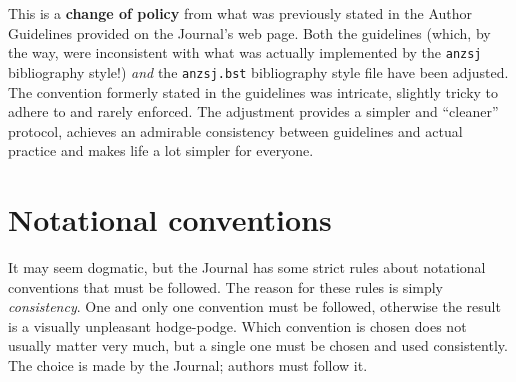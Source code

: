 \documentclass[times, doublespace]{anzsauth}
\begin{document}
This is a \textbf{change of policy} from what was previously stated
in the Author Guidelines provided on the Journal's web page.
Both the guidelines (which, by the way, were inconsistent with
what was actually implemented by the \texttt{anzsj} bibliography
style!) \emph{and} the \texttt{anzsj.bst} bibliography style file
have been adjusted.  The convention formerly stated in the guidelines
was intricate, slightly tricky to adhere to and rarely enforced.
The adjustment provides a simpler and ``cleaner'' protocol, achieves
an admirable consistency between guidelines and actual practice
and makes life a lot simpler for everyone.

\section{Notational conventions}
\label{sec:noteConv}
It may seem dogmatic, but the Journal has some strict rules
about notational conventions that must be followed.  The reason
for these rules is simply \emph{consistency}.  One and only one
convention must be followed, otherwise the result is a visually
unpleasant hodge-podge.  Which convention is chosen does not
usually matter very much, but a single one must be chosen and
used consistently.  The choice is made by the Journal; authors
must follow it.
\end{document}

